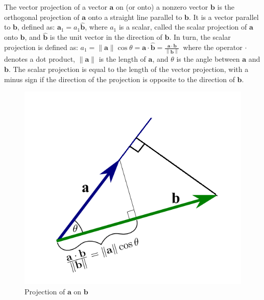 
The vector projection of a vector $\mathbf{a}$ on (or onto) a nonzero vector $\mathbf{b}$ is the orthogonal projection of $\mathbf{a}$ onto a straight line parallel to $\mathbf{b}$. It is a vector parallel to $\mathbf{b}$, defined as: $\mathbf{a}_{1}=a_{1}\mathbf{\hat {b}}$, where $a_{1}$ is a scalar, called the scalar projection of $\mathbf{a}$ onto $\mathbf{b}$, and $\mathbf{\hat{b}}$ is the unit vector in the direction of $\mathbf{b}$. In turn, the scalar projection is defined as: $a_{1}=\left\|\mathbf {a} \right\|\cos \theta =\mathbf {a} \cdot \mathbf{\hat{b}} = {\frac {\mathbf {a \cdot b} }{\left\|\mathbf {b} \right\|}}\,$ where the operator $\cdot$ denotes a dot product, $\|\mathbf{a}\|$ is the length of $\mathbf{a}$, and $\theta$ is the angle between $\mathbf{a}$ and $\mathbf{b}$. The scalar projection is equal to the length of the vector projection, with a minus sign if the direction of the projection is opposite to the direction of $\mathbf{b}$. 

\begin{figure}[H]
	\centering
	\includegraphics[width=.5\textwidth]{figures/A_proj.png}
	\caption{Projection of $\mathbf{a}$ on $\mathbf{b}$}\label{fig:A_proj}	
\end{figure}